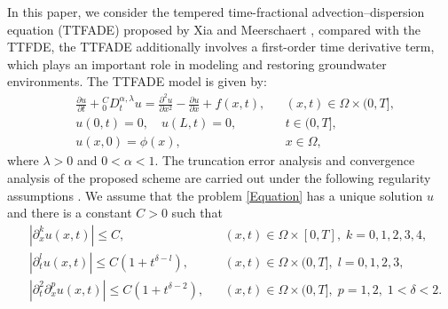 \documentclass[10pt, reqno]{amsart}
\theoremstyle{remark}
\theoremstyle{definition}
\numberwithin{table}{section}
\begin{document}
In this paper, we consider the tempered time-fractional advection–dispersion equation (TTFADE) proposed by Xia \cite{xia2013} and Meerschaert \cite{meerschaert2008}, compared with the TTFDE, the TTFADE additionally involves a first-order time derivative term, which plays an important role in modeling and restoring groundwater environments. The TTFADE model is given by:
\begin{subequations}\label{Equation}
\begin{align}
&\frac{\partial u}{\partial t} + { }_0^C D_t^{\alpha, \lambda} u
= \frac{\partial^2 u}{\partial x^2} - \frac{\partial u}{\partial x} + f(x,t),
& &(x,t) \in \Omega \times (0,T], \label{Equation1} \\
&u(0,t) = 0,\quad u(L,t) = 0,
& &t \in (0,T], \label{Equation2} \\
&u(x,0) = \phi(x),
& &x \in \Omega, \label{Equation3}
\end{align}
\end{subequations}
where $\lambda > 0$ and $0 < \alpha < 1$. The truncation error analysis and convergence analysis of the proposed scheme are carried out under the following regularity assumptions \cite{chen2019,feng2022,wang2023,safari2022,stynes2017,zhang2021}. We assume that the problem \ref{Equation} has a unique solution $u$ and there is a constant $C > 0$ such that
\begin{subequations}\label{regularity}
\begin{align}
&|\partial_x^k u(x, t)| \leq C,
&& (x, t) \in \Omega \times [0, T],\;k=0,1,2,3,4, \label{regularity1} \\
&|\partial_t^l u(x, t)| \leq C(1 + t^{\delta-l}),
&& (x, t) \in \Omega \times (0, T], \; l=0,1,2,3, \label{regularity2} \\
&|\partial_t^2 \partial_x^p u(x, t)| \leq C(1 + t^{\delta-2}),
&& (x, t) \in \Omega \times (0, T], \; p=1,2,\;1<\delta<2. \label{regularity3}
\end{align}
\end{subequations}
\end{document}
